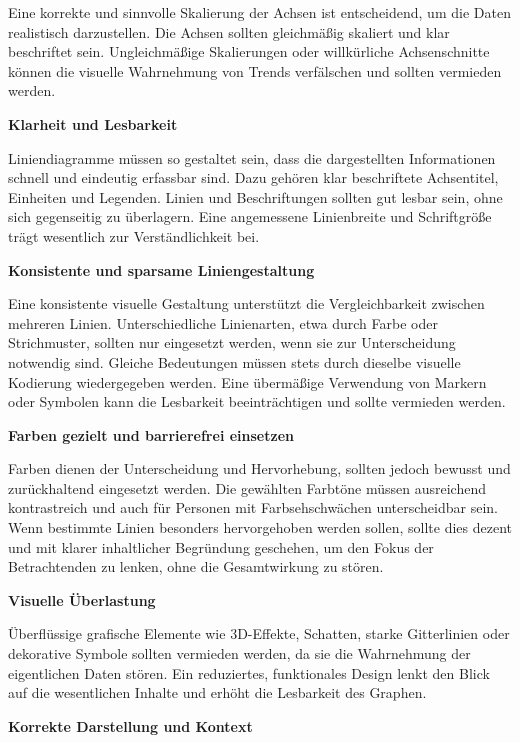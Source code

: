 Eine korrekte und sinnvolle Skalierung der Achsen ist entscheidend, um die Daten realistisch darzustellen.
Die Achsen sollten gleichmäßig skaliert und klar beschriftet sein.
Ungleichmäßige Skalierungen oder willkürliche Achsenschnitte können die visuelle Wahrnehmung von Trends verfälschen und sollten vermieden werden.

\item
\textbf{Klarheit und Lesbarkeit}

Liniendiagramme müssen so gestaltet sein, dass die dargestellten Informationen schnell und eindeutig erfassbar sind.
Dazu gehören klar beschriftete Achsentitel, Einheiten und Legenden.
Linien und Beschriftungen sollten gut lesbar sein, ohne sich gegenseitig zu überlagern.
Eine angemessene Linienbreite und Schriftgröße trägt wesentlich zur Verständlichkeit bei.

\item
\textbf{Konsistente und sparsame Liniengestaltung}

Eine konsistente visuelle Gestaltung unterstützt die Vergleichbarkeit zwischen mehreren Linien.
Unterschiedliche Linienarten, etwa durch Farbe oder Strichmuster, sollten nur eingesetzt werden, wenn sie zur Unterscheidung notwendig sind.
Gleiche Bedeutungen müssen stets durch dieselbe visuelle Kodierung wiedergegeben werden.
Eine übermäßige Verwendung von Markern oder Symbolen kann die Lesbarkeit beeinträchtigen und sollte vermieden werden.

\item
\textbf{Farben gezielt und barrierefrei einsetzen}

Farben dienen der Unterscheidung und Hervorhebung, sollten jedoch bewusst und zurückhaltend eingesetzt werden.
Die gewählten Farbtöne müssen ausreichend kontrastreich und auch für Personen mit Farbsehschwächen unterscheidbar sein.
Wenn bestimmte Linien besonders hervorgehoben werden sollen, sollte dies dezent und mit klarer inhaltlicher Begründung geschehen, um den Fokus der Betrachtenden zu lenken, ohne die Gesamtwirkung zu stören.

\item
\textbf{Visuelle Überlastung}

Überflüssige grafische Elemente wie 3D-Effekte, Schatten, starke Gitterlinien oder dekorative Symbole sollten vermieden werden, da sie die Wahrnehmung der eigentlichen Daten stören.
Ein reduziertes, funktionales Design lenkt den Blick auf die wesentlichen Inhalte und erhöht die Lesbarkeit des Graphen.

\item
\textbf{Korrekte Darstellung und Kontext}

